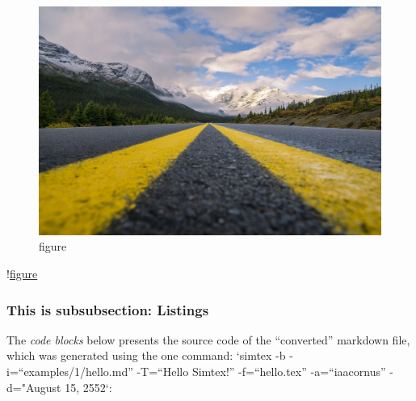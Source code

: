 \documentclass[12pt, UTF8]{article}
\begin{document}
	\begin{figure}[h]
		\includegraphics[width=\textwidth]{./sample_image.jpeg}
		\caption{figure}
	\end{figure}
	!\href{./sample_image.jpeg}{figure}
	\subsubsection{This is subsubsection: Listings}
	
	The \emph{code blocks} below presents the source code of the ``converted'' markdown file, which was generated using the one command: `simtex -b -i=``examples/1/hello.md'' -T=``Hello Simtex!'' -f=``hello.tex'' -a=``iaacornus'' -d="August 15, 2552`:
	
\end{document}
